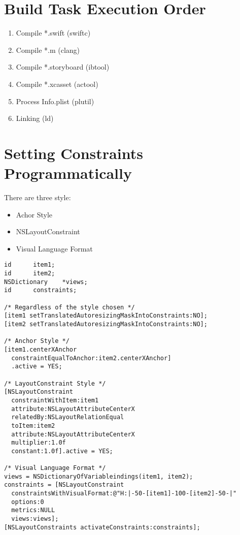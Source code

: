 \documentclass{article}
\begin{document}
\section{Build Task Execution Order}
\begin{enumerate}
\item Compile *.swift (swiftc)
\item Compile *.m (clang)
\item Compile *.storyboard (ibtool)
\item Compile *.xcasset (actool)
\item Process Info.plist (plutil)
\item Linking (ld)
\end{enumerate}

\section{Setting Constraints Programmatically}
There are three style:
\begin{itemize}
\item Achor Style
\item NSLayoutConstraint
\item Visual Language Format
\end{itemize}

\lstset{numbers=left}
\lstset{language=[Objective]C}
\begin{lstlisting}[frame=single]
id		item1;
id		item2;
NSDictionary	*views;
id		constraints;

/* Regardless of the style chosen */
[item1 setTranslatedAutoresizingMaskIntoConstraints:NO];
[item2 setTranslatedAutoresizingMaskIntoConstraints:NO];

/* Anchor Style */
[item1.centerXAnchor
  constraintEqualToAnchor:item2.centerXAnchor]
  .active = YES;

/* LayoutConstraint Style */
[NSLayoutConstraint 
  constraintWithItem:item1
  attribute:NSLayoutAttributeCenterX
  relatedBy:NSLayoutRelationEqual
  toItem:item2
  attribute:NSLayoutAttributeCenterX
  multiplier:1.0f
  constant:1.0f].active = YES;

/* Visual Language Format */
views = NSDictionaryOfVariableindings(item1, item2);
constraints = [NSLayoutConstraint
  constraintsWithVisualFormat:@"H:|-50-[item1]-100-[item2]-50-|"
  options:0
  metrics:NULL
  views:views];
[NSLayoutConstraints activateConstraints:constraints];
\end{lstlisting}
\end{document}
